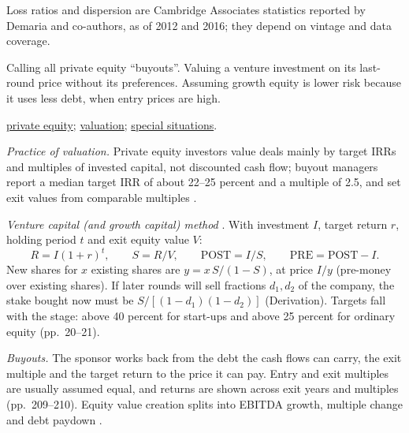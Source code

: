 \begin{qfmethod}
 Loss ratios and dispersion are Cambridge Associates statistics reported by Demaria and co-authors, as of 2012 and 2016; they depend on vintage and data coverage.

 Calling all private equity ``buyouts''. Valuing a venture investment on its last-round price without its preferences. Assuming growth equity is lower risk because it uses less debt, when entry prices are high.

 \hyperref[def:private-equity-features]{private equity}; \hyperref[meth:private-equity-valuation]{valuation}; \hyperref[meth:special-situations-distressed]{special situations}.

\end{qfmethod}

\begin{qfmethod}\label{meth:private-equity-valuation}
 \emph{Practice of valuation.} Private equity investors value deals mainly by target IRRs and multiples of invested capital, not discounted cash flow; buyout managers report a median target IRR of about 22--25 percent and a multiple of 2.5, and set exit values from comparable multiples \citep[NBER WP 21133, pp.~3, 13--17]{w5-gompers-kaplan-mukharlyamov}.

\emph{Venture capital (and growth capital) method} \citep[pp.~173--175]{ippolito-private-capital-2020}. With investment $I$, target return $r$, holding period $t$ and exit equity value $V$:
\[ R=I(1+r)^t,\qquad S=R/V,\qquad \mathrm{POST}=I/S,\qquad \mathrm{PRE}=\mathrm{POST}-I. \]
New shares for $x$ existing shares are $y=x\,S/(1-S)$, at price $I/y$ (pre-money over existing shares). If later rounds will sell fractions $d_1,d_2$ of the company, the stake bought now must be $S/[(1-d_1)(1-d_2)]$ (Derivation). Targets fall with the stage: above 40 percent for start-ups and above 25 percent for ordinary equity (pp.~20--21).

\emph{Buyouts.} The sponsor works back from the debt the cash flows can carry, the exit multiple and the target return to the price it can pay. Entry and exit multiples are usually assumed equal, and returns are shown across exit years and multiples (pp.~209--210). Equity value creation splits into EBITDA growth, multiple change and debt paydown \citep[pp.~162--163]{demaria-private-markets-2021}.


\end{qfmethod}
